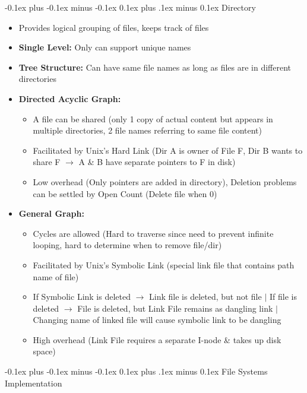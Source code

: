 \documentclass[landscape]{article}
\makeatletter
\renewcommand{\section}{\@startsection{section}{1}{0mm}%
  {-0.1ex plus -0.1ex minus -0.1ex}%
  {0.1ex plus .1ex minus 0.1ex}%
{\normalfont\small\bfseries}}
\renewcommand{\subsection}{\@startsection{subsection}{2}{0mm}%
  {-0.1ex plus -0.1ex minus -0.1ex}%
  {0.1ex plus .1ex minus 0.1ex}%
{\normalfont\scriptsize\bfseries}}
\makeatother
\begin{document}
\begin{multicols*}{6}
    \subsection{Directory}
    \begin{itemize}
      \item Provides logical grouping of files, keeps track of files
      \item \textbf{Single Level:} Only can support unique names
      \item \textbf{Tree Structure:} Can have same file names as long as files are in different directories
      \item \textbf{Directed Acyclic Graph:}
      \begin{itemize}
        \item A file can be shared (only 1 copy of actual content but appears in multiple directories, 2 file names referring to same file content)
        \item Facilitated by Unix's Hard Link (Dir A is owner of File F, Dir B wants to share F $\rightarrow$ A \& B have separate pointers to F in disk)
        \item Low overhead (Only pointers are added in directory), Deletion problems can be settled by Open Count (Delete file when 0)
      \end{itemize}
      \item \textbf{General Graph:}
      \begin{itemize}
        \item Cycles are allowed (Hard to traverse since need to prevent infinite looping, hard to determine when to remove file/dir)
        \item Facilitated by Unix's Symbolic Link (special link file that contains path name of file)
        \item If Symbolic Link is deleted $\rightarrow$ Link file is deleted, but not file $\vert$ If file is deleted $\rightarrow$ File is deleted, but Link File remains as dangling link $\vert$ Changing name of linked file will cause symbolic link to be dangling
        \item High overhead (Link File requires a separate I-node \& takes up disk space)
      \end{itemize}
    \end{itemize}

    \section{File Systems Implementation}

\end{multicols*}
\end{document}
